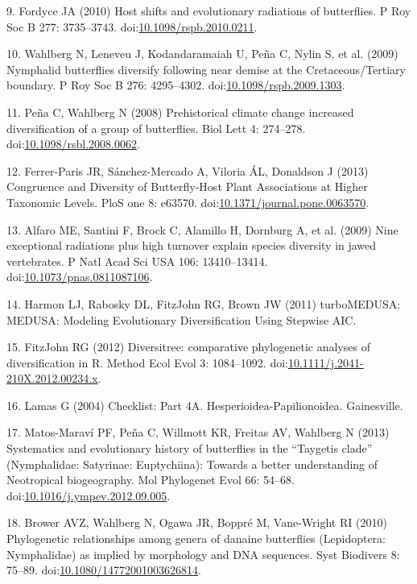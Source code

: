 \documentclass[10pt]{article}
\begin{document}
9. Fordyce JA (2010) Host shifts and evolutionary radiations of
butterflies. P Roy Soc B 277: 3735--3743.
doi:\href{http://dx.doi.org/10.1098/rspb.2010.0211}{10.1098/rspb.2010.0211}.

10. Wahlberg N, Leneveu J, Kodandaramaiah U, Pe\~na C, Nylin S, et al.
(2009) Nymphalid butterflies diversify following near demise at the
Cretaceous/Tertiary boundary. P Roy Soc B 276: 4295--4302.
doi:\href{http://dx.doi.org/10.1098/rspb.2009.1303}{10.1098/rspb.2009.1303}.

11. Pe\~na C, Wahlberg N (2008) Prehistorical climate change increased
diversification of a group of butterflies. Biol Lett 4: 274--278.
doi:\href{http://dx.doi.org/10.1098/rsbl.2008.0062}{10.1098/rsbl.2008.0062}.

12. Ferrer-Paris JR, S\'anchez-Mercado A, Viloria \'AL, Donaldson J (2013)
Congruence and Diversity of Butterfly-Host Plant Associations at Higher
Taxonomic Levels. PloS one 8: e63570.
doi:\href{http://dx.doi.org/10.1371/journal.pone.0063570}{10.1371/journal.pone.0063570}.

13. Alfaro ME, Santini F, Brock C, Alamillo H, Dornburg A, et al. (2009)
Nine exceptional radiations plus high turnover explain species diversity
in jawed vertebrates. P Natl Acad Sci USA 106: 13410--13414.
doi:\href{http://dx.doi.org/10.1073/pnas.0811087106}{10.1073/pnas.0811087106}.

14. Harmon LJ, Rabosky DL, FitzJohn RG, Brown JW (2011) turboMEDUSA:
MEDUSA: Modeling Evolutionary Diversification Using Stepwise AIC.

15. FitzJohn RG (2012) Diversitree: comparative phylogenetic analyses of
diversification in R. Method Ecol Evol 3: 1084--1092.
doi:\href{http://dx.doi.org/10.1111/j.2041-210X.2012.00234.x}{10.1111/j.2041-210X.2012.00234.x}.

16. Lamas G (2004) Checklist: Part 4A. Hesperioidea-Papilionoidea.
Gainesville.

17. Matos-Marav\'i PF, Pe\~na C, Willmott KR, Freitas AV, Wahlberg N (2013)
Systematics and evolutionary history of butterflies in the ``Taygetis
clade'' (Nymphalidae: Satyrinae: Euptychiina): Towards a better
understanding of Neotropical biogeography. Mol Phylogenet Evol 66:
54--68.
doi:\href{http://dx.doi.org/10.1016/j.ympev.2012.09.005}{10.1016/j.ympev.2012.09.005}.

18. Brower AVZ, Wahlberg N, Ogawa JR, Boppr\'e M, Vane-Wright RI (2010)
Phylogenetic relationships among genera of danaine butterflies
(Lepidoptera: Nymphalidae) as implied by morphology and DNA sequences.
Syst Biodivers 8: 75--89.
doi:\href{http://dx.doi.org/10.1080/14772001003626814}{10.1080/14772001003626814}.
\end{document}
